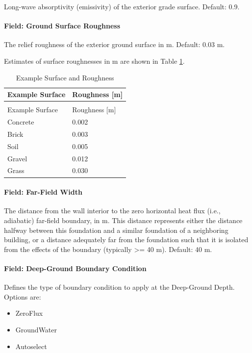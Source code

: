 Long-wave absorptivity (emissivity) of the exterior grade surface.
Default: 0.9.

\paragraph{Field: Ground Surface Roughness}\label{foundation-kiva-settings-ground-thermal-roughness}

The relief roughness of the exterior ground surface in m. Default: 0.03
m.

Estimates of surface roughnesses in m are shown in Table \ref{table:kiva-example-surface-and-roughness}.

\begin{longtable}[c]{@{}ll@{}}
\caption{Example Surface and Roughness \label{table:kiva-example-surface-and-roughness}} \tabularnewline
\toprule
Example Surface & Roughness {[}m{]} \tabularnewline
\midrule
\endfirsthead

\caption[]{Example Surface and Roughness} \tabularnewline
\toprule
Example Surface & Roughness {[}m{]} \tabularnewline
\midrule
\endhead

Concrete & 0.002 \tabularnewline
Brick & 0.003 \tabularnewline
Soil & 0.005 \tabularnewline
Gravel & 0.012 \tabularnewline
Grass & 0.030 \tabularnewline
\bottomrule
\end{longtable}

\paragraph{Field: Far-Field Width}\label{foundation-kiva-settings-far-field-width}

The distance from the wall interior to the zero horizontal heat flux
(i.e., adiabatic) far-field boundary, in m. This distance represents
either the distance halfway between this foundation and a similar
foundation of a neighboring building, or a distance adequately far from
the foundation such that it is isolated from the effects of the boundary
(typically \textgreater{}= 40 m). Default: 40 m.

\paragraph{Field: Deep-Ground Boundary Condition}\label{foundation-kiva-settings-deep-ground-boundary-condition}

Defines the type of boundary condition to apply at the Deep-Ground
Depth. Options are:

\begin{itemize}
\tightlist
\item
  ZeroFlux
\item
  GroundWater
\item
  Autoselect
\end{itemize}

